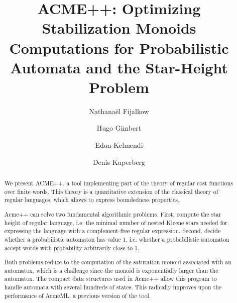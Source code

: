 \documentclass[11pt]{llncs}
\title{ACME++: Optimizing Stabilization Monoids Computations for Probabilistic Automata and the Star-Height Problem}
\author{Nathana\"el Fijalkow\inst{1,2} \and Hugo Gimbert\inst{3} \and Edon Kelmendi\inst{3} \and Denis Kuperberg\inst{4}}
\institute{LIAFA, Paris 7, France \and University of Warsaw, Poland \and LaBRI, Bordeaux, France \and Onera, Toulouse, France}
\begin{document}
\maketitle
\begin{abstract}
We present ACME++, 
a tool implementing part of the theory of regular cost functions
over finite words. 
This theory is a quantitative extension of the classical theory of regular languages,
which allows to express boundedness properties. 
%

Acme++ can solve two fundamental algorithmic problems.
First, compute the star height of regular language, 
i.e. the minimal number of nested Kleene stars needed for 
expressing the language with a complement-free regular expression.
Second, decide whether a probabilistic automaton has value 1,
i.e. whether a probabilistic automaton accept words with probability arbitrarily close to 1.

Both problems reduce to the computation of the saturation monoid associated with an automaton,
which is a challenge since the monoid is exponentially larger than the automaton.
The compact data structures used in Acme++ allow this program to handle automata with
several hundreds of states. This radically improves upon the performance of AcmeML,
a previous version of the tool.


\end{abstract}












\end{document}
